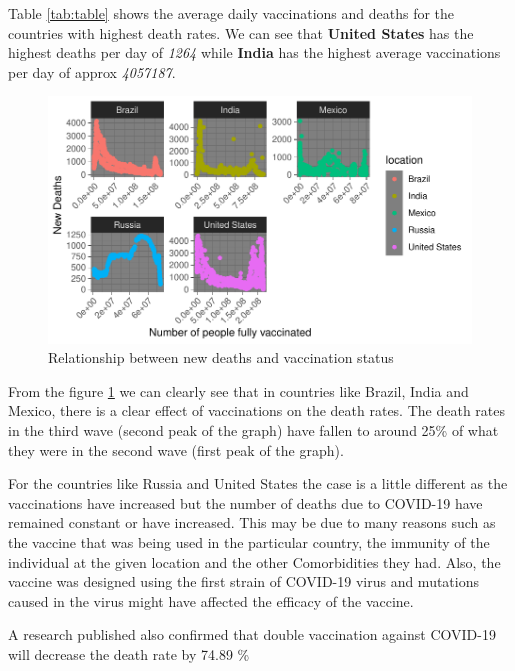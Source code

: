 \documentclass[11pt,a4paper,]{article}
\begin{document}
Table \ref{tab:table} shows the average daily vaccinations and deaths for the countries with highest death rates. We can see that \textbf{United States} has the highest deaths per day of \emph{1264} while \textbf{India} has the highest average vaccinations per day of approx \emph{4057187}.

\begin{figure}

{\centering \includegraphics{report_files/figure-latex/graph-1} 

}

\caption{Relationship between new deaths and vaccination status }\label{fig:graph}
\end{figure}

From the figure \ref{fig:graph} we can clearly see that in countries like Brazil, India and Mexico, there is a clear effect of vaccinations on the death rates. The death rates in the third wave (second peak of the graph) have fallen to around 25\% of what they were in the second wave (first peak of the graph).

For the countries like Russia and United States the case is a little different as the vaccinations have increased but the number of deaths due to COVID-19 have remained constant or have increased. This may be due to many reasons such as the vaccine that was being used in the particular country, the immunity of the individual at the given location and the other Comorbidities they had. Also, the vaccine was designed using the first strain of COVID-19 virus and mutations caused in the virus might have affected the efficacy of the vaccine.

A research published \textcite{paper} also confirmed that double vaccination against COVID-19 will decrease the death rate by 74.89 \%
\end{document}

